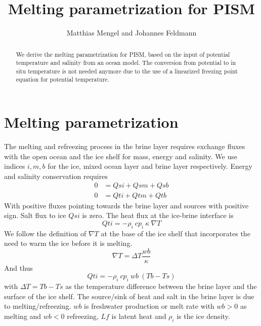 \documentclass{article}
\begin{document}
\title{Melting parametrization for PISM}


\author{Matthias Mengel and Johannes Feldmann}

\maketitle

\begin{abstract}
We derive the melting parametrization for PISM, based on the input of potential temperature and salinity from an ocean model. The conversion from potential to in situ temperature is not needed anymore due to the use of a linearized freezing point equation for potential temperature.


\end{abstract}

\newpage

\section{Melting parametrization}
\label{sec_meltparam}


The melting and refreezing process in the brine layer requires exchange fluxes with the open ocean and the ice shelf for mass, energy and salinity.
We use indices $i,m,b$ for the ice, mixed ocean layer and brine layer respectively.
Energy and salinity conservation requires
\begin{align*}
0 &= Qsi + Qsm + Qsb \\
0 &= Qti + Qtm + Qtb
\end{align*}
With positive fluxes pointing towards the brine layer and sources with positive sign.
Salt flux to ice $Qsi$ is zero. The heat flux at the ice-brine interface is
\begin{equation}
Qti = -\rho_i \ cp_i \ \kappa \ \nabla T
\end{equation}
We follow the \cite{Wexler1960,FoldvikKvinge1974,Hellmeretal1998}
definition of $\nabla T$ at the base of the ice shelf that incorporates the need to warm the ice before it is melting.
\begin{equation*}
\nabla T = \Delta T \frac{wb}{\kappa}
\end{equation*}
And thus
\begin{equation}
Qti = - \rho_i \ cp_i \ wb \ (Tb - Ts)
\end{equation}
with $\Delta T = Tb - Ts$ as the temperature difference between the brine layer and the surface of the ice shelf.
The source/sink of heat and salt in the brine layer is due to melting/refreezing.
$wb$ is freshwater production or melt rate with $wb>0$ as melting and $wb<0$ refreezing, $Lf$ is latent heat and $\rho_i$ is the ice density.
\end{document}
